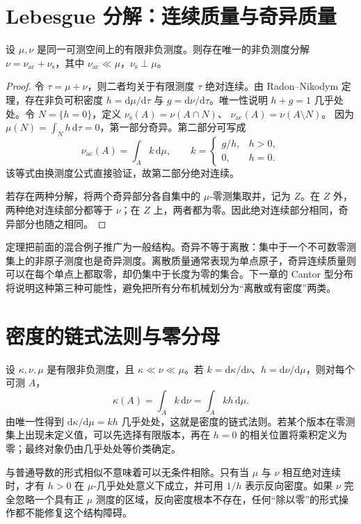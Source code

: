 \section{Lebesgue 分解：连续质量与奇异质量}
\begin{theorem}
设 $\mu,\nu$ 是同一可测空间上的有限非负测度。则存在唯一的非负测度分解
$\nu=\nu_{\mathrm{ac}}+\nu_{\mathrm{s}}$，其中
$\nu_{\mathrm{ac}}\ll\mu$，$\nu_{\mathrm{s}}\perp\mu$。
\label{thm:mt-lebesgue-decomposition}
\end{theorem}
\begin{proof}
令 $\tau=\mu+\nu$，则二者均关于有限测度 $\tau$ 绝对连续。由 Radon--Nikodym 定理，存在非负可积密度 $h=\mathrm d\mu/\mathrm d\tau$ 与 $g=\mathrm d\nu/\mathrm d\tau$。唯一性说明 $h+g=1$ 几乎处处。令 $N=\{h=0\}$，定义
$\nu_{\mathrm s}(A)=\nu(A\cap N)$、
$\nu_{\mathrm{ac}}(A)=\nu(A\setminus N)$。
因为 $\mu(N)=\int_Nh\,\mathrm d\tau=0$，第一部分奇异。第二部分可写成
\[
 \nu_{\mathrm{ac}}(A)=\int_A k\,\mathrm d\mu,\qquad
 k=\begin{cases}g/h,&h>0,\\0,&h=0.\end{cases}
\]
该等式由换测度公式直接验证，故第二部分绝对连续。

若存在两种分解，将两个奇异部分各自集中的 $\mu$-零测集取并，记为 $Z$。在 $Z$ 外，两种绝对连续部分都等于 $\nu$；在 $Z$ 上，两者都为零。因此绝对连续部分相同，奇异部分也随之相同。
\end{proof}

定理把前面的混合例子推广为一般结构。奇异不等于离散：集中于一个不可数零测集上的非原子测度也是奇异测度。离散质量通常表现为单点原子，奇异连续质量则可以在每个单点上都取零，却仍集中于长度为零的集合。下一章的 Cantor 型分布将说明这种第三种可能性，避免把所有分布机械划分为“离散或有密度”两类。

\section{密度的链式法则与零分母}
设 $\kappa,\nu,\mu$ 是有限非负测度，且 $\kappa\ll\nu\ll\mu$。若 $k=\mathrm d\kappa/\mathrm d\nu$、$h=\mathrm d\nu/\mathrm d\mu$，则对每个可测 $A$，
\[
 \kappa(A)=\int_Ak\,\mathrm d\nu=\int_Akh\,\mathrm d\mu.
\]
由唯一性得到 $\mathrm d\kappa/\mathrm d\mu=kh$ 几乎处处，这就是密度的链式法则。若某个版本在零测集上出现未定义值，可以先选择有限版本，再在 $h=0$ 的相关位置将乘积定义为零；最终对象仍由几乎处处等价类确定。

与普通导数的形式相似不意味着可以无条件相除。只有当 $\mu$ 与 $\nu$ 相互绝对连续时，才有 $h>0$ 在 $\mu$-几乎处处意义下成立，并可用 $1/h$ 表示反向密度。如果 $\nu$ 完全忽略一个具有正 $\mu$ 测度的区域，反向密度根本不存在，任何“除以零”的形式操作都不能修复这个结构障碍。

